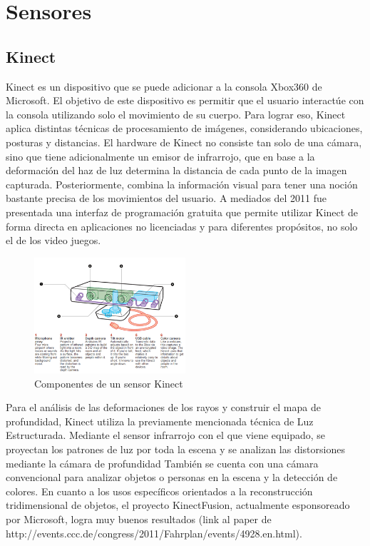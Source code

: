 \section{Sensores}
\subsection{Kinect}

Kinect es un dispositivo que se puede adicionar a la consola  Xbox360 de Microsoft. El objetivo de este dispositivo es permitir que el usuario interactúe con la consola utilizando solo el movimiento de su cuerpo. Para lograr eso, Kinect aplica distintas técnicas de procesamiento de imágenes, considerando ubicaciones, posturas y distancias. El hardware de Kinect no consiste tan solo de una cámara, sino que tiene adicionalmente un emisor de infrarrojo, que en base a la deformación del haz de luz determina la distancia de cada punto de la imagen capturada. Posteriormente, combina la información visual para tener una noción bastante precisa de los movimientos del usuario. A mediados del 2011 fue presentada una interfaz de programación gratuita que permite utilizar Kinect de forma directa en aplicaciones no licenciadas y para diferentes propósitos, no solo el de los video juegos.

\begin{figure}[H]
  \centering
    \includegraphics[width=0.5\textwidth]{./Cap6_reconstruccion/kinect.PNG}
  \caption{Componentes de un sensor Kinect}
  \label{fig:Kinect}
\end{figure}

Para el análisis de las deformaciones de los rayos y construir el mapa de profundidad, Kinect utiliza la previamente mencionada técnica de Luz Estructurada. Mediante el sensor infrarrojo con el que viene equipado, se proyectan los patrones de luz por toda la escena y se analizan las distorsiones mediante la cámara de profundidad
También se cuenta con una cámara convencional para analizar objetos o personas en la escena y la detección de colores.
En cuanto a los usos específicos orientados a la reconstrucción tridimensional de objetos, el proyecto KinectFusion, actualmente esponsoreado por Microsoft, logra muy buenos resultados (link al paper de http://events.ccc.de/congress/2011/Fahrplan/events/4928.en.html).

